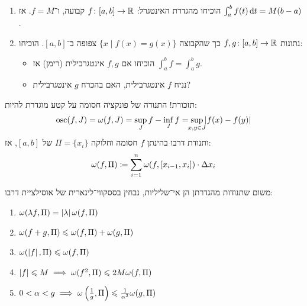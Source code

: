 \documentclass[name=רשימות חדו''א 2א]{../../../tex/classes/noChapterMegasumPreamble}
\begin{document}
	\begin{Exercise}
		\begin{enumerate}
			\item הוכיחו מהגדרת האינטגרל: $f \colon [a, b] \to \mathbb{R}$ קבועה, ו־$f = M$. אז $\int^b_a f(t) \,\mathrm{d}t = M(b - a)$.
			\item נתונות $f, g \colon [a, b] \to \mathbb{R}$ כך שהקבוצה $\{x \mid f(x) = g(x)\}$ צפופה ב־$[a, b]$. הוכיחו:
			\begin{itemize}[A.]
				\item הוכיחו אם $f, g$ אינטגרבילית (רימן) אז $\int^b_a f = \int^b_a g$.
				\item נניח $f$ אינטגרבילית, האם בהכרח $g$ אינטגרבילית?
			\end{itemize}
		\end{enumerate}
	\end{Exercise}


	תזכורת! התנודה של פונקציה חסומה על קטע מוגדרת להיות:
	\[ \mathrm{osc}(f, J) = \wg(f, J) = \sup_J f - \inf_J f = \sup_{\mathclap{x, y \in J}} \sof{f(x) - f(y)} \]
	ותנודת דרבו בהינתן $f$ חסומה וחלוקה $\Pi = \{x_i\}$ של $[a, b]$, אז:
	\[ \omega(f, \Pi) \coloneqq \sum_{i = 1}^{n}\omega(f, [x_{i - 1}, x_i]) \cdot \Delta x_i \]
	\begin{Collary}
		משום שתנודות מהגדרתן הן אי־שליליות, נבחין בססקווי־לינארית של אוסילציית דרבו:
		\begin{enumerate}
			\item \hfil $\omega(\lambda f, \Pi) = \left \lvert \lambda \right \rvert \omega(f, \Pi)$
			\item \hfil $\omega(f + g, \Pi) \leqslant \omega(f, \Pi) + \omega(g, \Pi)$
			\item \hfil $\omega(\left \lvert f \right \rvert, \Pi) \leqslant \omega(f, \Pi)$
			\item \hfil $\left \lvert f \right \rvert \leqslant M \implies \omega(f^{2}, \Pi) \leqslant 2M\omega(f, \Pi)$
			\item \hfil $0 < \alpha < g \implies \omega\left ( \frac{1}{g}, \Pi \right ) \leqslant \frac{1}{\alpha^{2}}\omega(g, \Pi)$
		\end{enumerate}
	\end{Collary}
\end{document}
